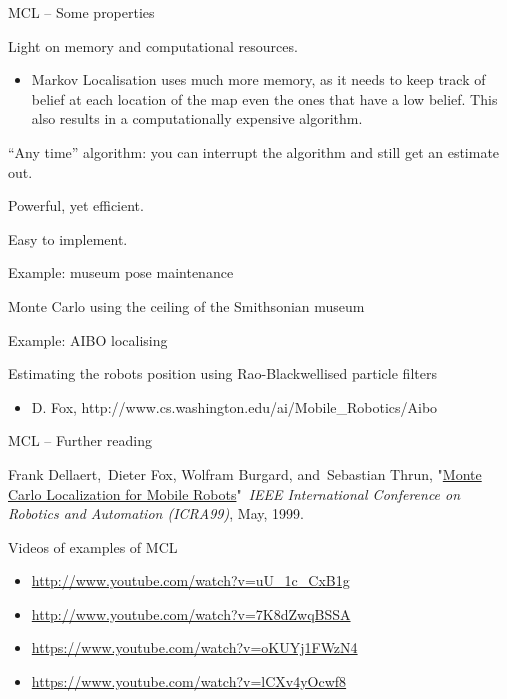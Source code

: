 \documentclass[compress]{beamer}
\begin{document}
\begin{frame}{MCL -- Some properties}

Light on memory and computational resources.

\begin{itemize}
\item Markov Localisation uses much more memory, as it needs to keep track
  of belief at each location of the map even the ones that have a low
  belief. This also results in a computationally expensive algorithm.
\end{itemize}

``Any time'' algorithm: you can interrupt the algorithm and still get an
estimate out.

Powerful, yet efficient.

Easy to implement.

\end{frame}

\begin{frame}{Example: museum pose maintenance}

Monte Carlo using the ceiling of the Smithsonian museum

    \begin{center}
    \end{center}

\end{frame}

\begin{frame}{Example: AIBO localising}

Estimating the robots position using Rao-Blackwellised particle filters

\begin{itemize}
\item D. Fox, http://www.cs.washington.edu/ai/Mobile\_Robotics/Aibo
\end{itemize}

\end{frame}

\begin{frame}{MCL -- Further reading}

Frank Dellaert,~Dieter Fox, Wolfram Burgard, and~Sebastian Thrun,
"\href{http://www.ri.cmu.edu/publication_view.html?pub_id=533}{Monte
Carlo Localization for Mobile Robots}"~\emph{IEEE International
Conference on Robotics and Automation (ICRA99)}, May, 1999.

Videos of examples of MCL

\begin{itemize}
\item \url{http://www.youtube.com/watch?v=uU_1c_CxB1g}
\item \url{http://www.youtube.com/watch?v=7K8dZwqBSSA}
\item \url{https://www.youtube.com/watch?v=oKUYj1FWzN4}
\item \url{https://www.youtube.com/watch?v=lCXv4yOcwf8}
\end{itemize}

\end{frame}
\end{document}
